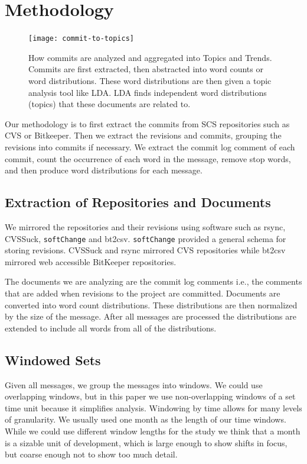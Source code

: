 \documentclass[times, 10pt,twocolumn]{article}
\newcommand{\shrinkit}{\vspace*{-.3em}}
\begin{document}
\shrinkit
\section{Methodology}
\shrinkit
\begin{figure}[t]
  \centering
  \texttt{[image: commit-to-topics]} 
  \caption{How commits are analyzed and aggregated into Topics and Trends. Commits are first extracted, then abstracted into word counts or word distributions. These word distributions are then given a topic analysis tool like LDA. LDA finds independent word distributions (topics) that these documents are related to.}
  \label{fig:commits}
\end{figure}



Our methodology is to first extract the commits from SCS repositories
such as CVS or Bitkeeper. Then we extract the revisions and commits,
grouping the revisions into commits if necessary. We extract the
commit log comment of each commit, count the occurrence of each word
in the message, remove stop words, and then produce word distributions
for each message.


\shrinkit
\subsection{Extraction of  Repositories and Documents}
\shrinkit

We mirrored the repositories and their revisions using software such
as rsync, CVSSuck, \texttt{softChange} and bt2csv.
\texttt{softChange} provided a general schema for storing
revisions. CVSSuck and rsync mirrored CVS repositories while bt2csv
mirrored web accessible BitKeeper repositories.

The documents we are analyzing are the commit log comments i.e., the
comments that are added when revisions to the project are committed.
Documents are converted into word count distributions. These
distributions are then normalized by the size of the message. After
all messages are processed the distributions are extended to include
all words from all of the  distributions.

\shrinkit
\subsection{Windowed Sets}
\shrinkit

Given all messages, we group the messages into windows. We could use
overlapping windows, but in this paper we use non-overlapping windows
of a set time unit because it simplifies analysis.  Windowing by time
allows for many levels of granularity.  We usually used one month as
the length of our time windows. While we could use different window
lengths for the study we think that a month is a sizable unit of
development, which is large enough to show shifts in focus, but coarse
enough not to show too much detail.
\end{document}

